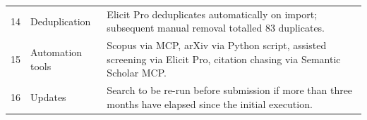 \begin{longtable}{p{0.5cm}p{4cm}p{9cm}}
14 & Deduplication & Elicit Pro deduplicates automatically on import; subsequent manual removal totalled 83 duplicates. \\
15 & Automation tools & Scopus via MCP, arXiv via Python script, assisted screening via Elicit Pro, citation chasing via Semantic Scholar MCP. \\
16 & Updates & Search to be re-run before submission if more than three months have elapsed since the initial execution. \\
\end{longtable}
